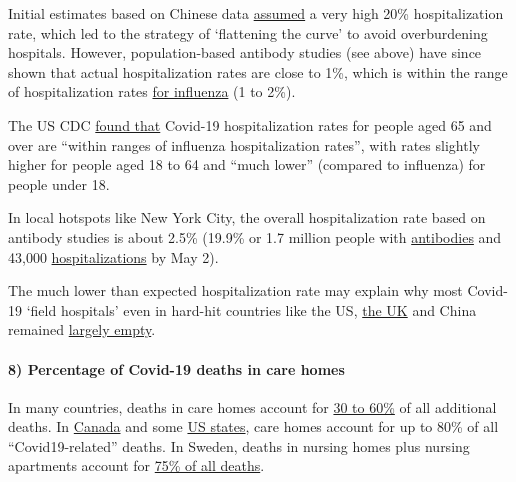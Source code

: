 Initial estimates based on Chinese data
\href{https://www.npr.org/sections/goatsandsoda/2020/03/20/815408287/how-the-novel-coronavirus-and-the-flu-are-alike-and-different}{assumed}
a very high 20\% hospitalization rate, which led to the strategy of
`flattening the curve' to avoid overburdening hospitals. However,
population-based antibody studies (see above) have since shown that
actual hospitalization rates are close to 1\%, which is within the range
of hospitalization rates
\href{https://www.cdc.gov/flu/about/burden/index.html}{for influenza} (1
to 2\%).

The US CDC
\href{https://www.cdc.gov/coronavirus/2019-ncov/covid-data/covidview/index.html}{found
that} Covid-19 hospitalization rates for people aged 65 and over are
``within ranges of influenza hospitalization rates'', with rates
slightly higher for people aged 18 to 64 and ``much lower'' (compared to
influenza) for people under 18.

In local hotspots like New York City, the overall hospitalization rate
based on antibody studies is about 2.5\% (19.9\% or 1.7 million people
with
\href{https://www.governor.ny.gov/news/amid-ongoing-covid-19-pandemic-governor-cuomo-announces-results-completed-antibody-testing}{antibodies}
and 43,000
\href{https://www1.nyc.gov/assets/doh/downloads/pdf/imm/covid-19-daily-data-summary-hospitalizations-05022020-1.pdf}{hospitalizations}
by May 2).

The much lower than expected hospitalization rate may explain why most
Covid-19 `field hospitals' even in hard-hit countries like the US,
\href{https://www.hsj.co.uk/service-design/newly-opened-nightingale-to-remain-empty-for-time-being/7027465.article}{the
UK} and China remained
\href{https://www.npr.org/2020/05/07/851712311/u-s-field-hospitals-stand-down-most-without-treating-any-covid-19-patients}{largely
empty}.

\hypertarget{8-percentage-of-covid-19-deaths-in-care-homes}{%
\paragraph{8) Percentage of Covid-19 deaths in care
homes}\label{8-percentage-of-covid-19-deaths-in-care-homes}}

In many countries, deaths in care homes account for
\href{https://ltccovid.org/2020/04/12/mortality-associated-with-covid-19-outbreaks-in-care-homes-early-international-evidence/}{30
to 60\%} of all additional deaths. In
\href{https://www.washingtonpost.com/world/the_americas/coronavirus-canada-long-term-care-nursing-homes/2020/05/18/01494ad4-947f-11ea-87a3-22d324235636_story.html}{Canada}
and some
\href{https://freopp.org/the-covid-19-nursing-home-crisis-by-the-numbers-3a47433c3f70}{US
states}, care homes account for up to 80\% of all ``Covid19-related''
deaths. In Sweden, deaths in nursing homes plus nursing apartments
account for
\href{https://www.thelocal.se/20200525/swedish-death-toll-passes-4000-as-coronavirus-cases-in-care-homes-start-to-fall}{75\%
of all deaths}.

